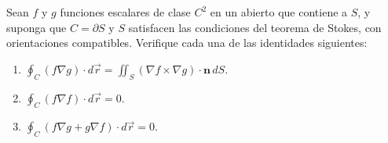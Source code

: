 ﻿Sean $f$ y $g$ funciones escalares de clase $C^2$ en un abierto que contiene a $S$, y suponga que $C=\partial S$ y $S$ satisfacen las condiciones del teorema de Stokes, con orientaciones compatibles. Verifique cada una de las identidades siguientes:
\begin{enumerate}
\item $\displaystyle\oint_C(f\nabla g)\cdot d\vec r
=\iint_S(\nabla f\times\nabla g)\cdot\mathbf n\,dS$.
\item $\displaystyle\oint_C(f\nabla f)\cdot d\vec r=0$.
\item $\displaystyle\oint_C(f\nabla g+g\nabla f)\cdot d\vec r=0$.
\end{enumerate}
